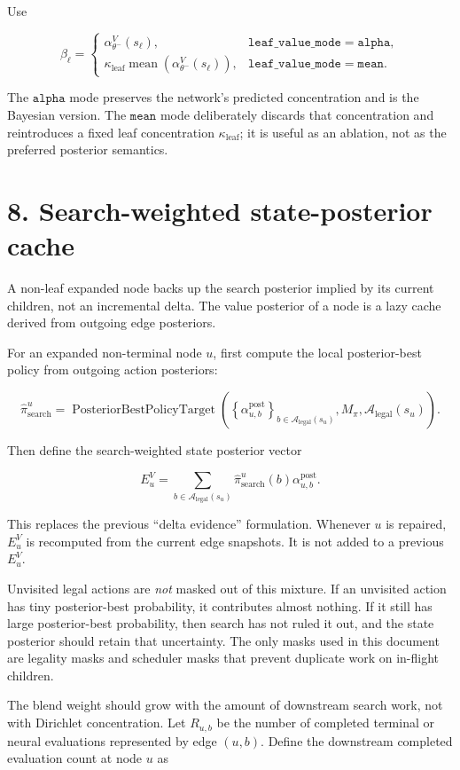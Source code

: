 \documentclass[11pt]{article}
\newcommand{\mean}{\operatorname{mean}}
\newcommand{\Legal}{\mathcal{A}_{\mathrm{legal}}}
\newcommand{\PosteriorBestPolicyTarget}{\operatorname{PosteriorBestPolicyTarget}}
\begin{document}
Use

\[
\beta_\ell
=
\begin{cases}
\alpha_{\theta^-}^V(s_\ell),
&\texttt{leaf\_value\_mode}=\texttt{alpha},\\[4pt]
\kappa_{\mathrm{leaf}}
\mean\!\left(\alpha_{\theta^-}^V(s_\ell)\right),
&\texttt{leaf\_value\_mode}=\texttt{mean}.
\end{cases}
\]

The \(\texttt{alpha}\) mode preserves the network's predicted concentration and
is the Bayesian version. The \(\texttt{mean}\) mode deliberately discards that
concentration and reintroduces a fixed leaf concentration
\(\kappa_{\mathrm{leaf}}\); it is useful as an ablation, not as the preferred
posterior semantics.

\section*{8. Search-weighted state-posterior cache}

A non-leaf expanded node backs up the search posterior implied by its current
children, not an incremental delta. The value posterior of a node is a lazy
cache derived from outgoing edge posteriors.

For an expanded non-terminal node \(u\), first compute the local posterior-best
policy from outgoing action posteriors:

\[
\hat\pi_{\mathrm{search}}^u
=
\PosteriorBestPolicyTarget
\left(
\left\{
\alpha^{\mathrm{post}}_{u,b}
\right\}_{b\in\Legal(s_u)},
M_\pi,
\Legal(s_u)
\right).
\]

Then define the search-weighted state posterior vector

\[
E^V_u
=
\sum_{b\in\Legal(s_u)}
\hat\pi_{\mathrm{search}}^u(b)
\alpha^{\mathrm{post}}_{u,b}.
\]

This replaces the previous ``delta evidence'' formulation. Whenever \(u\) is
repaired, \(E^V_u\) is recomputed from the current edge snapshots. It is not
added to a previous \(E^V_u\).

Unvisited legal actions are \emph{not} masked out of this mixture. If an
unvisited action has tiny posterior-best probability, it contributes almost
nothing. If it still has large posterior-best probability, then search has not
ruled it out, and the state posterior should retain that uncertainty. The only
masks used in this document are legality masks and scheduler masks that prevent
duplicate work on in-flight children.

The blend weight should grow with the amount of downstream search work, not with
Dirichlet concentration. Let \(R_{u,b}\) be the number of completed terminal or
neural evaluations represented by edge \((u,b)\). Define the downstream completed
evaluation count at node \(u\) as
\end{document}
